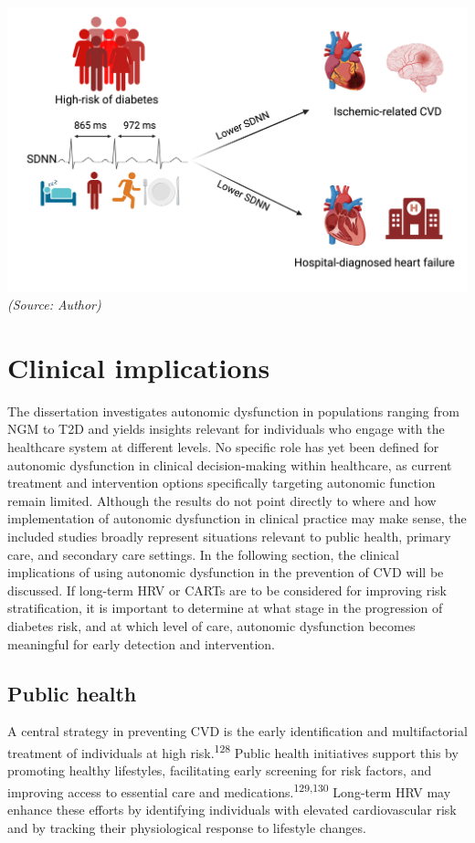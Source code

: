 \documentclass[
  a4paper,
  headsepline=true,
  open=left]{scrbook}
\begin{document}
\includegraphics{images/ADD_PRO_IMG.png} \emph{(Source: Author)}

\hypertarget{clinical-implications}{%
\section{Clinical implications}\label{clinical-implications}}

The dissertation investigates autonomic dysfunction in populations
ranging from NGM to T2D and yields insights relevant for individuals who
engage with the healthcare system at different levels. No specific role
has yet been defined for autonomic dysfunction in clinical
decision-making within healthcare, as current treatment and intervention
options specifically targeting autonomic function remain limited.
Although the results do not point directly to where and how
implementation of autonomic dysfunction in clinical practice may make
sense, the included studies broadly represent situations relevant to
public health, primary care, and secondary care settings. In the
following section, the clinical implications of using autonomic
dysfunction in the prevention of CVD will be discussed. If long-term HRV
or CARTs are to be considered for improving risk stratification, it is
important to determine at what stage in the progression of diabetes
risk, and at which level of care, autonomic dysfunction becomes
meaningful for early detection and intervention.

\hypertarget{public-health}{%
\subsection{Public health}\label{public-health}}

A central strategy in preventing CVD is the early identification and
multifactorial treatment of individuals at high
risk.\textsuperscript{128} Public health initiatives support this by
promoting healthy lifestyles, facilitating early screening for risk
factors, and improving access to essential care and
medications.\textsuperscript{129,130} Long-term HRV may enhance these
efforts by identifying individuals with elevated cardiovascular risk and
by tracking their physiological response to lifestyle changes.
\end{document}
